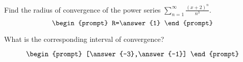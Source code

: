 \documentclass{ximera}
\author{Gregory Hartman \and Matthew Carr}
\begin{document}
\begin{exercise}




Find the radius of convergence of the power series $\sum_{n=1}^{\infty}\frac{(x+2)^n}{n^3}$.
\[
\begin{prompt}
R=\answer{1}
\end{prompt}
\]

What is the corresponding interval of convergence?

\[
\begin{prompt}
[\answer{-3},\answer{-1}]
\end{prompt}
\]

\end{exercise}
\end{document}

